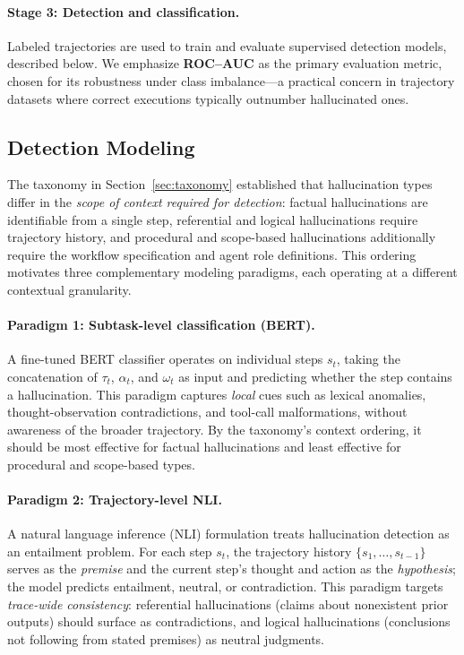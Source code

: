 \documentclass{article}
\begin{document}
\paragraph{Stage 3: Detection and classification.}
Labeled trajectories are used to train and evaluate supervised detection models, described below. We emphasize \textbf{ROC--AUC} as the primary evaluation metric, chosen for its robustness under class imbalance---a practical concern in trajectory datasets where correct executions typically outnumber hallucinated ones.

\subsection{Detection Modeling}
\label{sec:modeling}

The taxonomy in Section~\ref{sec:taxonomy} established that hallucination types differ in the \emph{scope of context required for detection}: factual hallucinations are identifiable from a single step, referential and logical hallucinations require trajectory history, and procedural and scope-based hallucinations additionally require the workflow specification and agent role definitions. This ordering motivates three complementary modeling paradigms, each operating at a different contextual granularity.

\paragraph{Paradigm 1: Subtask-level classification (BERT).}
A fine-tuned BERT classifier operates on individual steps $s_t$, taking the concatenation of $\tau_t$, $\alpha_t$, and $\omega_t$ as input and predicting whether the step contains a hallucination. This paradigm captures \emph{local} cues such as lexical anomalies, thought-observation contradictions, and tool-call malformations, without awareness of the broader trajectory. By the taxonomy's context ordering, it should be most effective for factual hallucinations and least effective for procedural and scope-based types.

\paragraph{Paradigm 2: Trajectory-level NLI.}
A natural language inference (NLI) formulation treats hallucination detection as an entailment problem. For each step $s_t$, the trajectory history $\{s_1, \ldots, s_{t-1}\}$ serves as the \emph{premise} and the current step's thought and action as the \emph{hypothesis}; the model predicts entailment, neutral, or contradiction. This paradigm targets \emph{trace-wide consistency}: referential hallucinations (claims about nonexistent prior outputs) should surface as contradictions, and logical hallucinations (conclusions not following from stated premises) as neutral judgments.
\end{document}
